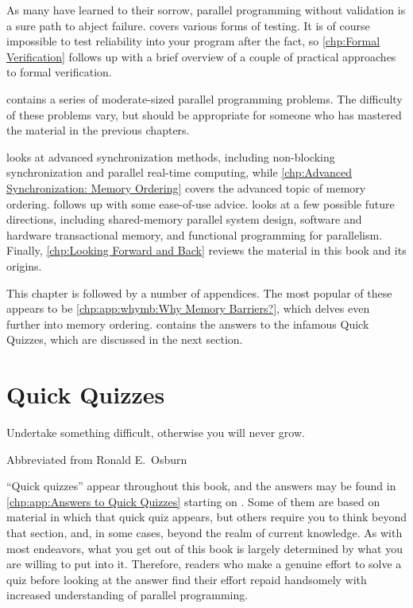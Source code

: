As many have learned to their sorrow, parallel programming without
validation is a sure path to abject failure.
 covers various forms of testing.
It is of course impossible to test reliability into your program
after the fact, so \cref{chp:Formal Verification}
follows up with a brief overview of a couple of practical approaches to
formal verification.

contains a series of moderate-sized parallel programming problems.
The difficulty of these problems vary, but should be appropriate for
someone who has mastered the material in the previous chapters.

looks at advanced synchronization methods, including
non-blocking synchronization and parallel real-time computing,
while \cref{chp:Advanced Synchronization: Memory Ordering}
covers the advanced topic of memory ordering.
 follows up with some ease-of-use advice.
looks at a few possible future directions, including
shared-memory parallel system design, software and hardware transactional
memory, and functional programming for parallelism.
Finally, \cref{chp:Looking Forward and Back} reviews the material in
this book and its origins.

This chapter is followed by a number of appendices.
The most popular of these appears to be
\cref{chp:app:whymb:Why Memory Barriers?},
which delves even further into memory ordering.
contains the answers to the infamous Quick Quizzes, which are discussed in
the next section.

\section{Quick Quizzes}
\label{sec:howto:Quick Quizzes}
%
\epigraph{Undertake something difficult, otherwise you will never grow.}
	 {Abbreviated from Ronald E.~Osburn}

``Quick quizzes'' appear throughout this book, and the answers may
be found in
\cref{chp:app:Answers to Quick Quizzes} starting on
.
Some of them are based on material in which that quick quiz
appears, but others require you to think beyond that section, and,
in some cases, beyond the realm of current knowledge.
As with most endeavors, what you get out of this book is largely
determined by what you are willing to put into it.
Therefore, readers who make a genuine effort to solve a quiz before
looking at the answer
find their effort repaid handsomely with increased understanding
of parallel programming.


